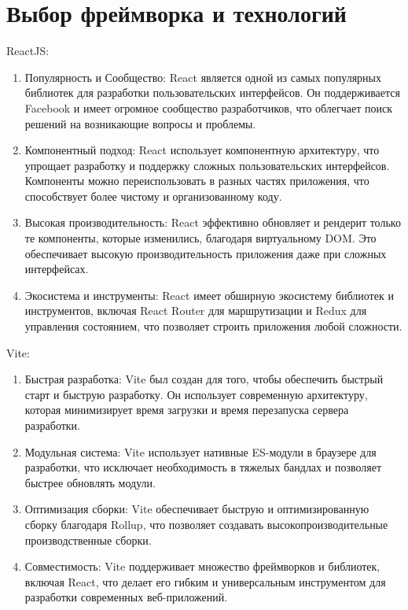 \section{Выбор фреймворка и технологий}\label{sec:---}

ReactJS:
\begin{enumerate}
    \item Популярность и Сообщество: React является одной из самых популярных библиотек для разработки пользовательских интерфейсов.
    Он поддерживается Facebook и имеет огромное сообщество разработчиков, что облегчает поиск решений на возникающие вопросы и проблемы.

    \item Компонентный подход: React использует компонентную архитектуру, что упрощает разработку и поддержку сложных пользовательских интерфейсов.
    Компоненты можно переиспользовать в разных частях приложения, что способствует более чистому и организованному коду.

    \item Высокая производительность: React эффективно обновляет и рендерит только те компоненты, которые изменились, благодаря виртуальному DOM\@.
    Это обеспечивает высокую производительность приложения даже при сложных интерфейсах.

    \item Экосистема и инструменты: React имеет обширную экосистему библиотек и инструментов, включая React Router для маршрутизации и Redux для управления состоянием, что позволяет строить приложения любой сложности.

\end{enumerate}


Vite:
\begin{enumerate}
    \item Быстрая разработка: Vite был создан для того, чтобы обеспечить быстрый старт и быструю разработку.
    Он использует современную архитектуру, которая минимизирует время загрузки и время перезапуска сервера разработки.


    \item Модульная система: Vite использует нативные ES-модули в браузере для разработки, что исключает необходимость в тяжелых бандлах и позволяет быстрее обновлять модули.

    \item Оптимизация сборки: Vite обеспечивает быструю и оптимизированную сборку благодаря Rollup, что позволяет создавать высокопроизводительные производственные сборки.

    \item Совместимость: Vite поддерживает множество фреймворков и библиотек, включая React, что делает его гибким и универсальным инструментом для разработки современных веб-приложений.

\end{enumerate}


